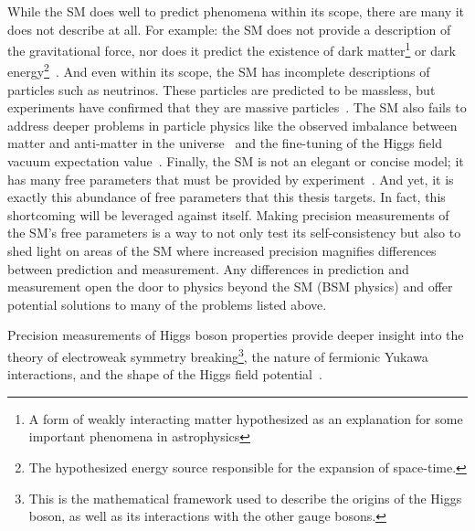 While the SM does well to predict phenomena within its scope, there are many it does not describe at all. For example: the SM does not provide a description of the gravitational force, nor does it predict the existence of dark matter\footnote{A form of weakly interacting matter hypothesized as an explanation for some important phenomena in astrophysics} or dark energy\footnote{The hypothesized energy source responsible for the expansion of space-time.}~\cite{dark_matter_2020}. And even within its scope, the SM has incomplete descriptions of particles such as neutrinos. These particles are predicted to be massless, but experiments have confirmed that they are massive particles~\cite{Mertens_2016}. The SM also fails to address deeper problems in particle physics like the observed imbalance between matter and anti-matter in the universe~\cite{sakharov_1991} and the fine-tuning of the Higgs field vacuum expectation value~\cite{weinberg_1976,susskind_1979}. Finally, the SM is not an elegant or concise model; it has many free parameters that must be provided by experiment~\cite{review_of_particle_2020}. And yet, it is exactly this abundance of free parameters that this thesis targets. In fact, this shortcoming will be leveraged against itself. Making precision measurements of the SM's free parameters is a way to not only test its self-consistency but also to shed light on areas of the SM where increased precision magnifies differences between prediction and measurement. Any differences in prediction and measurement open the door to physics beyond the SM (BSM physics) and offer potential solutions to many of the problems listed above. 

Precision measurements of Higgs boson properties provide deeper insight into the theory of electroweak symmetry breaking\footnote{This is the mathematical framework used to describe the origins of the Higgs boson, as well as its interactions with the other gauge bosons.}, the nature of fermionic Yukawa interactions, and the shape of the Higgs field potential~\cite{ew_phase_transition_1996,ew_phase_transition_1999}. 
 
